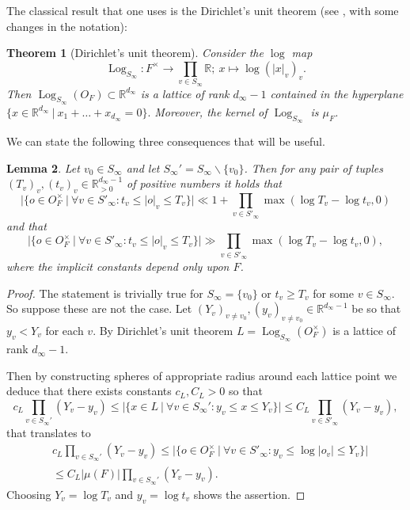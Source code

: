 \documentclass[a4paper,11pt]{amsart}
\newtheorem{theorem}{Theorem}[section]
\newtheorem{lemma}[theorem]{Lemma}
\theoremstyle{definition}
\newcommand{\R}{\mathbb{R}}
\begin{document}
The classical result that one uses is the Dirichlet's unit theorem (see \cite[Unit Theorem]{lang1986algebraic}, with some changes in the notation):
\begin{theorem}[Dirichlet's unit theorem]
 Consider the $\log$ map 
    \[\operatorname{Log}_{S_\infty}\colon F^{\times} \to \prod_{v\in S_\infty}\R;\ x \mapsto \operatorname{log}(\vert{x}\vert_v)_v.\]
    Then $\operatorname{Log}_{S_\infty}(O_F) \subset \R^{d_{\infty}}$ is a lattice of rank $d_{\infty}-1$ contained in the hyperplane $\{x \in \R^{d_\infty}\ | \ x_1+\dots + x_{d_\infty} = 0\}.$
    Moreover, the kernel of $\operatorname{Log}_{S_{\infty}}$ is $\mu_F$.
\end{theorem}

We can state the following three consequences that will be useful.
\begin{lemma}\label{lem:unithteorem1}Let $v_0 \in S_{\infty}$ and let $S_{\infty}' = S_{\infty}\smallsetminus \{v_0\}$. Then for any pair of tuples $(T_v)_{v}, (t_v)_v \in \R_{>0}^{d_{\infty}-1}$  of positive numbers it holds that 
    \[\vert{\{o\in O_F^{\times}\ | \ \forall v \in S'_{\infty} : t_v\leq \vert{o}\vert_v \leq T_v\}}\vert \ll 1+\prod_{v\in S'_{\infty}}\max(\log T_v-\log t_v,0)\]
    and that 
     \[\vert{\{o\in O_F^{\times}\ | \ \forall v \in S'_{\infty} : t_v\leq \vert{o}\vert_v \leq T_v\}}\vert \gg \prod_{v\in S'_{\infty}}\max(\log T_v-\log t_v,0),\]
     where the implicit constants depend only upon $F$. 
\end{lemma}
\begin{proof}The statement is trivially true for $S_{\infty} = \{v_0\}$ or $t_v\geq  T_v$ for some $v\in S_{\infty}$. So suppose these are not the case.
    Let $(Y_v)_{v\neq v_0},(y_v)_{v\neq v_0} \in \R^{d_{\infty}-1}$ be so that $y_v < Y_v$ for each $v$. 
    By Dirichlet's unit theorem $L = \operatorname{Log}_{S_{\infty}}(O^{\times}_F)$ is a lattice of rank $d_{\infty}-1$.
    
    Then by constructing spheres of appropriate radius around each lattice point we deduce that there exists constants $c_L,C_L >0$ so that  
    \[c_L\prod_{v\in S_{\infty}'}(Y_v-y_v) \leq \vert{\{x \in L\ | \ \forall v \in S_{\infty}':y_v\leq x \leq Y_v \}}\vert \leq C_L\prod_{v\in S'_{\infty}}(Y_v-y_v),\]
    that translates to
    \begin{align*}&c_L\prod_{v\in S_{\infty}'}(Y_v-y_v)\leq  \vert{\{o \in O_F^{\times}\ | \  \forall v\in S'_{\infty}: y_v\leq \log\vert{o}_v\vert \leq  Y_v\}}\vert \\&\leq C_L\vert{\mu(F)}\vert \prod_{v\in S_{\infty}'}(Y_v-y_v).\end{align*}
    Choosing $Y_v = \log T_v$ and $y_v = \log t_v$ shows the assertion.
\end{proof}
\end{document}
